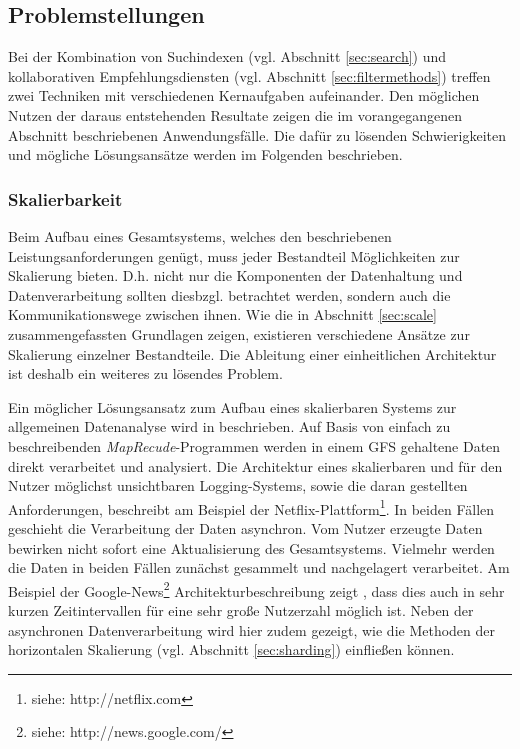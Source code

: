 \newpage
\subsection{Problemstellungen}

Bei der Kombination von Suchindexen (vgl. Abschnitt \ref{sec:search}) und kollaborativen Empfehlungsdiensten (vgl. Abschnitt \ref{sec:filtermethods}) treffen zwei Techniken mit verschiedenen Kernaufgaben aufeinander. Den möglichen Nutzen der daraus entstehenden Resultate zeigen die im vorangegangenen Abschnitt beschriebenen Anwendungsfälle. Die dafür zu lösenden Schwierigkeiten und mögliche Lösungsansätze werden im Folgenden beschrieben.

\subsubsection{Skalierbarkeit}\label{sec:scale2}

Beim Aufbau eines  Gesamtsystems, welches den beschriebenen Leistungsanforderungen genügt, muss jeder Bestandteil Möglichkeiten zur Skalierung bieten. D.h. nicht nur die Komponenten der Datenhaltung und Datenverarbeitung sollten diesbzgl. betrachtet werden, sondern auch die Kommunikationswege zwischen ihnen. Wie die in Abschnitt \ref{sec:scale} zusammengefassten Grundlagen zeigen, existieren verschiedene Ansätze zur Skalierung einzelner Bestandteile. Die Ableitung einer einheitlichen Architektur ist deshalb ein weiteres zu lösendes Problem.

Ein möglicher Lösungsansatz zum Aufbau eines skalierbaren Systems zur allgemeinen Datenanalyse wird in \citep{Lin2012} beschrieben. Auf Basis von einfach zu beschreibenden \textit{MapRecude}-Programmen werden in einem \acs{GFS} gehaltene Daten direkt verarbeitet und analysiert. Die Architektur eines skalierbaren und für den Nutzer möglichst unsichtbaren Logging-Systems, sowie die daran gestellten Anforderungen, beschreibt \citep{netflix2012} am Beispiel der Netflix-Plattform\footnote{siehe: http://netflix.com}. In beiden Fällen geschieht die Verarbeitung der Daten asynchron. Vom Nutzer erzeugte Daten bewirken nicht sofort eine Aktualisierung des Gesamtsystems. Vielmehr werden die Daten in beiden Fällen zunächst gesammelt und nachgelagert verarbeitet. Am Beispiel der Google-News\footnote{siehe: http://news.google.com/} Architekturbeschreibung zeigt \citep{Das07}, dass dies auch in sehr kurzen Zeitintervallen für eine sehr große Nutzerzahl möglich ist. Neben der asynchronen Datenverarbeitung wird hier zudem gezeigt, wie die Methoden der horizontalen Skalierung (vgl. Abschnitt \ref{sec:sharding}) einfließen können.

